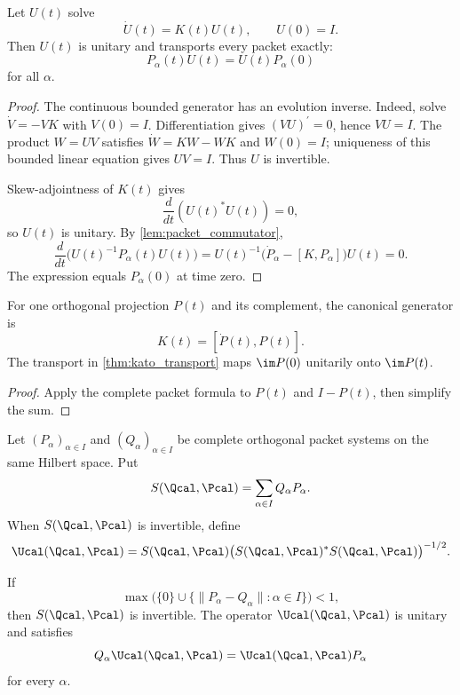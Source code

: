 \begin{theorem}\label{thm:kato_transport}
Let $U(t)$ solve
\[
\dot U(t)=K(t)U(t),
\qquad
U(0)=I.
\]
Then $U(t)$ is unitary and transports every packet exactly:
\[
P_\alpha(t)U(t)=U(t)P_\alpha(0)
\]
for all $\alpha$.
\end{theorem}

\begin{proof}
The continuous bounded generator has an evolution inverse. Indeed, solve $\dot V=-VK$ with $V(0)=I$. Differentiation gives $(VU)^{\prime}=0$, hence $VU=I$. The product $W=UV$ satisfies $\dot W=KW-WK$ and $W(0)=I$; uniqueness of this bounded linear equation gives $UV=I$. Thus $U$ is invertible.

Skew-adjointness of $K(t)$ gives
\[
\frac{d}{dt}(U(t)^*U(t))=0,
\]
so $U(t)$ is unitary.  By \cref{lem:packet_commutator},
\[
\frac{d}{dt}\big(U(t)^{-1}P_\alpha(t)U(t)\big)
=
U(t)^{-1}\big(\dot P_\alpha-[K,P_\alpha]\big)U(t)
=0.
\]
The expression equals $P_\alpha(0)$ at time zero.
\end{proof}

\begin{corollary}\label{cor:one_moving_subspace}
For one orthogonal projection $P(t)$ and its complement, the canonical generator is
\[
K(t)=[\dot P(t),P(t)].
\]
The transport in \cref{thm:kato_transport} maps $\im P(0)$ unitarily onto $\im P(t)$.
\end{corollary}

\begin{proof}
Apply the complete packet formula to $P(t)$ and $I-P(t)$, then simplify the sum.
\end{proof}


\begin{definition}\label{def:packet_direct_rotation}
Let $(P_\alpha)_{\alpha\in I}$ and $(Q_\alpha)_{\alpha\in I}$ be complete orthogonal packet systems on the same Hilbert space.  Put
\[
S(\Qcal,\Pcal)=\sum_{\alpha\in I}Q_\alpha P_\alpha.
\]
When $S(\Qcal,\Pcal)$ is invertible, define
\[
\Ucal(\Qcal,\Pcal)
=
S(\Qcal,\Pcal)
\big(S(\Qcal,\Pcal)^*S(\Qcal,\Pcal)\big)^{-1/2}.
\]
\end{definition}

\begin{proposition}\label{prop:packet_direct_rotation}
If
\[
\max\bigl(\{0\}\cup\{\|P_\alpha-Q_\alpha\|:\alpha\in I\}\bigr)<1,
\]
then $S(\Qcal,\Pcal)$ is invertible.  The operator $\Ucal(\Qcal,\Pcal)$ is unitary and satisfies
\[
Q_\alpha\Ucal(\Qcal,\Pcal)
=
\Ucal(\Qcal,\Pcal)P_\alpha
\]
for every $\alpha$.
\end{proposition}

